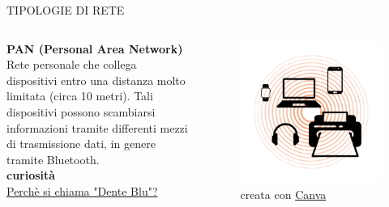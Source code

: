 \documentclass[aspectratio=1610, handout]{beamer}
\begin{document}
\begin{frame}{TIPOLOGIE DI RETE}
    \begin{columns}
            \justifying
            \textbf{PAN (Personal Area Network)} \\
            Rete personale che collega dispositivi entro una distanza molto limitata (circa 10 metri). Tali 
            dispositivi possono scambiarsi informazioni tramite differenti mezzi di trasmissione dati, in genere 
            tramite Bluetooth.\\
            \bigskip
            \tiny{\textbf{curiosità}}\\
            \tiny{\href{https://www.ilpost.it/2014/12/31/bluetooth/}{Perchè si chiama "Dente Blu"?}}
            \begin{figure}
                \includegraphics[width=\linewidth]{img/pan.png}
                \caption{{creata con \href{https://www.canva.com/}{Canva}}}
            \end{figure}
    \end{columns}
\end{frame}
\end{document}
